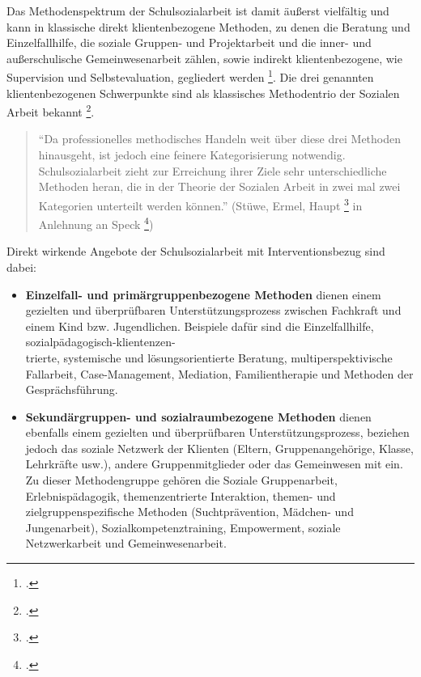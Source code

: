 \noindent
Das Methodenspektrum der Schulsozialarbeit ist damit äußerst vielfältig und kann in klassische direkt klientenbezogene Methoden, zu denen die Beratung und Einzelfallhilfe, die soziale Gruppen- und Projektarbeit und die inner- und außerschulische Gemeinwesenarbeit zählen, sowie indirekt klientenbezogene, wie Supervision und Selbstevaluation, gegliedert werden \footcites[vgl.][22]{Kilb2009}[vgl.][64]{Speck2007}. Die drei genannten klientenbezogenen Schwerpunkte sind als klassisches Methodentrio der Sozialen Arbeit bekannt \footcite[vgl.][95]{Stuewe2015}. 

\begin{quotation}
\noindent
"`Da professionelles methodisches Handeln weit über diese drei Methoden hinausgeht, ist jedoch eine feinere Kategorisierung notwendig. Schulsozialarbeit zieht zur Erreichung ihrer Ziele sehr unterschiedliche Methoden heran, die in der Theorie der Sozialen Arbeit in zwei mal zwei Kategorien unterteilt werden können."' (Stüwe, Ermel, Haupt \footcite[vgl.][95]{Stuewe2015} in Anlehnung an Speck \footcite[vgl.][64f]{Speck2007})
\end{quotation}

\noindent
Direkt wirkende Angebote der Schulsozialarbeit mit Interventionsbezug sind dabei:\\
\begin{itemize}
	\item \textbf{Einzelfall- und primärgruppenbezogene Methoden} dienen einem gezielten und überprüfbaren Unterstützungsprozess zwischen Fachkraft und einem Kind bzw. Jugendlichen. Beispiele dafür sind die Einzelfallhilfe, sozialpädagogisch-klientenzen-\\
	trierte, systemische und lösungsorientierte Beratung, multiperspektivische Fallarbeit, Case-Management, Mediation, Familientherapie und Methoden der Gesprächsführung. 
	\item \textbf{Sekundärgruppen- und sozialraumbezogene Methoden} dienen ebenfalls einem gezielten und überprüfbaren Unterstützungsprozess, beziehen jedoch das soziale Netzwerk der Klienten (Eltern, Gruppenangehörige, Klasse, Lehrkräfte usw.), andere Gruppenmitglieder oder das Gemeinwesen mit ein. Zu dieser Methodengruppe gehören die Soziale Gruppenarbeit, Erlebnispädagogik, themenzentrierte Interaktion, themen- und zielgruppenspezifische Methoden (Suchtprävention, Mädchen- und Jungenarbeit), Sozialkompetenztraining, Empowerment, soziale Netzwerkarbeit und Gemeinwesenarbeit. 
\end{itemize}

